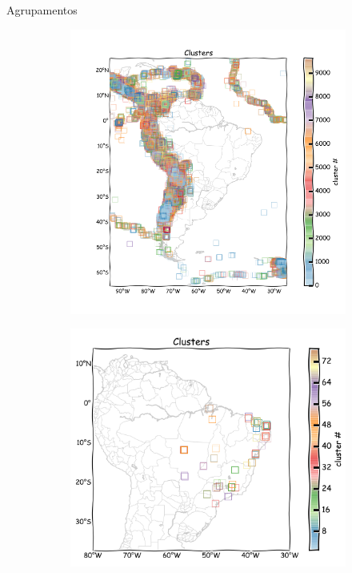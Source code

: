 \documentclass[ucs,8pt]{beamer}
\begin{document}
\begin{frame}{Agrupamentos}
\begin{figure}[H]
	\centering
	\begin{subfigure}[t]{0.46\textwidth}
		  	\centering
			\includegraphics[width=1.00\textwidth]{hmtk_sa3_pp_decluster}
			\label{fig:sa_decluster}
	\end{subfigure}%
	\quad %
	\begin{subfigure}[t]{0.50\textwidth}
		  	\centering
			\includegraphics[width=1.00\textwidth]{hmtk_bsb2013_pp_decluster}

\end{subfigure}
\end{figure}
\end{frame}
\end{document}
